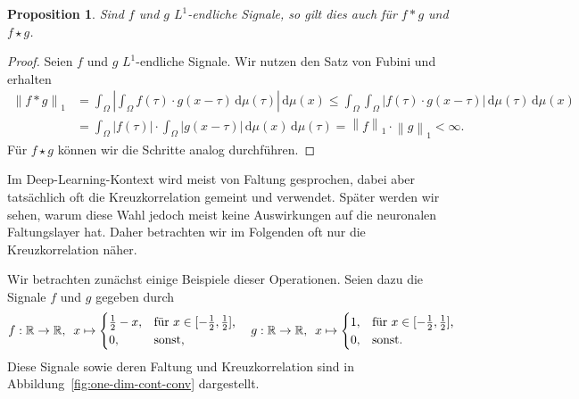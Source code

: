 \documentclass[paper=a4, 	%
		fontsize=11pt,
		abstract=true, 	%
		headsepline, 	%
		notitlepage	%
		]{scrartcl}
\newtheorem{proposition}[theorem]{Proposition}
\theoremstyle{definition}
\newcommand{\R}{\mathbb{R}}
\newcommand{\diff}{\,\textrm{d}}
\newcommand{\norm}[1]{\left\lVert#1\right\rVert}
\newcommand{\abs}[1]{\left\lvert#1\right\rvert}
\begin{document}
\begin{proposition}
    Sind $f$ und $g$ $L^1$-endliche Signale, so gilt dies auch für $f * g$ und $f\star g$.
\end{proposition}
\begin{proof}
    Seien $f$ und $g$ $L^1$-endliche Signale. Wir nutzen den Satz von Fubini und erhalten
    \begin{align*}
        \norm{f * g}_1
        &= \int_{\Omega} \abs{ \int_\Omega f(\tau)\cdot g(x - \tau) \diff\mu(\tau) }\diff \mu(x)
        \leq \int_{\Omega}  \int_{\Omega} \abs{f(\tau)\cdot g(x - \tau)} \diff\mu(\tau) \diff \mu(x)\\
        &= \int_{\Omega} \abs{f(\tau)} \cdot \int_{\Omega} \abs{g(x-\tau)} \diff \mu(x) \diff\mu(\tau)
        = \norm{f}_1 \cdot \norm{g}_1 < \infty.
    \end{align*}
    Für $f \star g$ können wir die Schritte analog durchführen.
\end{proof}

Im Deep-Learning-Kontext wird meist von Faltung gesprochen, dabei aber tat\-säch\-lich oft die Kreuzkorrelation gemeint und verwendet.
Später werden wir sehen, warum diese Wahl jedoch meist keine Auswirkungen auf die neuronalen Faltungslayer hat.
Daher betrachten wir im Folgenden oft nur die Kreuzkorrelation näher.

Wir betrachten zunächst einige Beispiele dieser Operationen.
Seien dazu die Signale $f$ und $g$ gegeben durch
\begin{align*}
    f: \R \rightarrow \R, \hspace{0.5em} x \mapsto \begin{cases}
        \frac{1}{2} - x, & \text{für $x\in[-\frac{1}{2},\frac{1}{2}]$,}\\
        0, & \text{sonst,}
    \end{cases} \quad
    g: \R \rightarrow \R,\hspace{0.5em} x \mapsto \begin{cases}
        1,& \text{für $x \in [-\frac{1}{2},\frac{1}{2}]$,}\\
        0, & \text{sonst.}
    \end{cases}
\end{align*}
Diese Signale sowie deren Faltung und Kreuzkorrelation sind in Abbildung~\ref{fig:one-dim-cont-conv} dargestellt.
\end{document}
